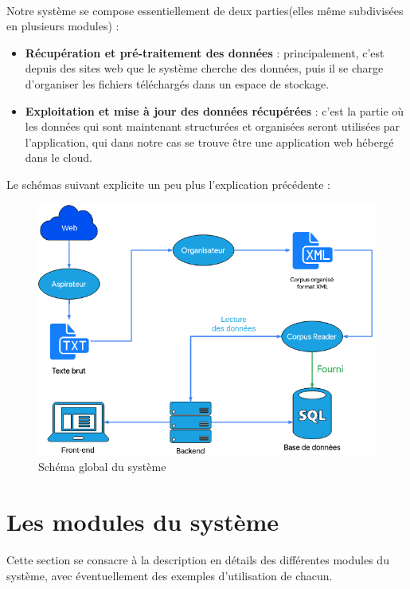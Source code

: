 \documentclass[]{report}
\begin{document}
		\paragraph{}
		Notre système se compose essentiellement de deux parties(elles même subdivisées en plusieurs modules) : 
		\begin{itemize}
			\item \textbf{Récupération et pré-traitement des données } : principalement, c'est depuis des sites web que le système 
			cherche des données, puis il se charge d'organiser les fichiers téléchargés dans un espace de stockage.
			\item \textbf{Exploitation et mise à jour des données récupérées} : c'est la partie où les données qui sont maintenant
			structurées et organisées seront utilisées par l'application, qui dans notre cas se trouve être une application web hébergé dans le cloud.
		\end{itemize}
		\par 
		Le schémas suivant explicite un peu plus l'explication précédente : 
		
		\begin{figure}[H]
			\centering
			\includegraphics[scale=0.4]{images/app_schema.png}
			\caption{Schéma global du système}
			
		\end{figure}
		
	\section{Les modules du système}
		\paragraph{}
		Cette section se consacre à la description en détails des différentes modules du système, avec éventuellement des exemples d'utilisation de chacun.
\end{document}
